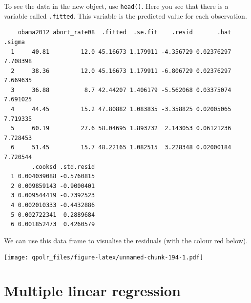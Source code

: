 \documentclass[12pt,oneside]{reedthesis}
\theoremstyle{definition}
\theoremstyle{definition}
\theoremstyle{definition}
\theoremstyle{remark}
\begin{document}
  To see the data in the new object, use \texttt{head()}. Here you see
  that there is a variable called \texttt{.fitted}. This variable is the
  predicted value for each observation.
  \begin{Shaded}
  \begin{Highlighting}[]
  \end{Highlighting}
  \end{Shaded}
  \begin{verbatim}
    obama2012 abort_rate08  .fitted  .se.fit    .resid       .hat   .sigma
  1     40.81         12.0 45.16673 1.179911 -4.356729 0.02376297 7.708398
  2     38.36         12.0 45.16673 1.179911 -6.806729 0.02376297 7.669635
  3     36.88          8.7 42.44207 1.406179 -5.562068 0.03375074 7.691025
  4     44.45         15.2 47.80882 1.083835 -3.358825 0.02005065 7.719335
  5     60.19         27.6 58.04695 1.893732  2.143053 0.06121236 7.728453
  6     51.45         15.7 48.22165 1.082515  3.228348 0.02000184 7.720544
        .cooksd .std.resid
  1 0.004039088 -0.5760815
  2 0.009859143 -0.9000401
  3 0.009544419 -0.7392523
  4 0.002010333 -0.4432886
  5 0.002722341  0.2889684
  6 0.001852473  0.4260579
  \end{verbatim}
  We can use this data frame to visualise the residuals (with the colour
  red below).
  \begin{Shaded}
  \begin{Highlighting}[]
  \NormalTok{(}\OperatorTok{+}
  \StringTok{  }\NormalTok{(}\NormalTok{(}
          \NormalTok{) }\OperatorTok{+}
  \StringTok{  }\NormalTok{() }\OperatorTok{+}
  \StringTok{  }\NormalTok{(}\NormalTok{(}
  \end{Highlighting}
  \end{Shaded}
  \texttt{[image: qpolr\_files/figure-latex/unnamed-chunk-194-1.pdf]}
  
  \section{Multiple linear regression}\label{multiple-linear-regression}
  
\end{document}
